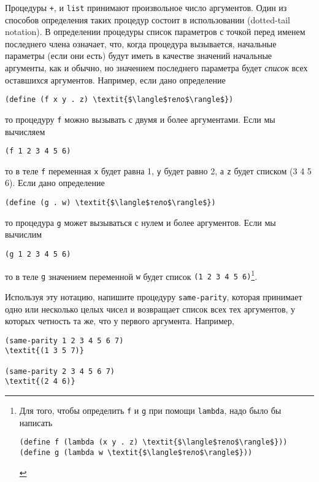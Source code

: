 \begin{exercise}{2.20}\label{EX2.20}%
Процедуры {\tt +}, {\tt *} и
{\tt list} принимают    произвольное число
аргументов.  Один из  способов определения таких процедур состоит в
использовании   (dotted-tail notation). 
В определении процедуры список параметров с точкой перед 
именем последнего члена означает, что, когда процедура вызывается,
начальные параметры (если они есть) будут иметь в качестве значений
начальные аргументы, как и обычно, но значением последнего параметра
будет {\em список} всех оставшихся аргументов.  Например, если
дано определение
\begin{Verbatim}[fontsize=\small]
(define (f x y . z) \textit{$\langle$тело$\rangle$})
\end{Verbatim}
то процедуру {\tt f} можно вызывать с двумя и более
аргументами.  Если мы вычисляем

\begin{Verbatim}[fontsize=\small]
(f 1 2 3 4 5 6)
\end{Verbatim}
то в теле {\tt f} переменная {\tt x} будет равна 1,
{\tt y} будет равно 2, а {\tt z} будет списком (3 4 5
6).  Если дано определение

\begin{Verbatim}[fontsize=\small]
(define (g . w) \textit{$\langle$тело$\rangle$})
\end{Verbatim}
то процедура {\tt g} может вызываться с нулем и более
аргументов.  Если мы вычислим

\begin{Verbatim}[fontsize=\small]
(g 1 2 3 4 5 6)
\end{Verbatim}
то в теле {\tt g} значением переменной {\tt w} будет
список {\tt (1 2 3 4 5 6)}\footnote{Для того, чтобы определить {\tt f} и
{\tt g} при помощи {\tt lambda}, надо было бы написать


\begin{Verbatim}[fontsize=\footnotesize]
(define f (lambda (x y . z) \textit{$\langle$тело$\rangle$}))
(define g (lambda w \textit{$\langle$тело$\rangle$}))
\end{Verbatim}
}.

Используя эту нотацию, напишите процедуру
{\tt same-parity}, которая принимает одно или несколько целых чисел 
и возвращает список всех тех аргументов, у которых четность та же, что 
у первого аргумента. Например,

\begin{Verbatim}[fontsize=\small]
(same-parity 1 2 3 4 5 6 7)
\textit{(1 3 5 7)}

(same-parity 2 3 4 5 6 7)
\textit{(2 4 6)}
\end{Verbatim}
\end{exercise}

